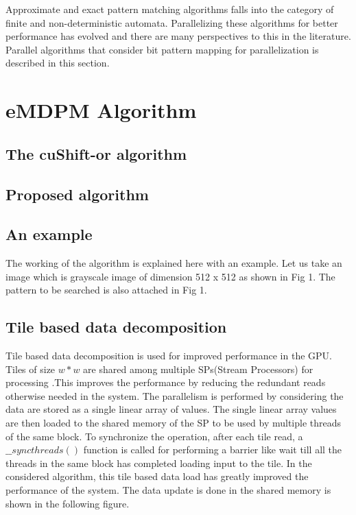 \documentclass[graybox]{svmult}
\begin{document}
Approximate and exact pattern matching algorithms falls into the category of finite and non-deterministic automata. Parallelizing these algorithms for better performance has evolved and there are many perspectives to this in the literature. Parallel algorithms that consider bit pattern mapping for parallelization is described in this section.

\section{eMDPM Algorithm}
\label{sec:3}

\subsection{The cuShift-or algorithm}
\label{subsec:1}

\subsection{Proposed algorithm}
\label{subsec:2}

\subsection{An example}
\label{subsec:3}
The working of the algorithm is explained here with an example. Let us take an image which is grayscale image of dimension 512 x 512 as shown in Fig 1. The pattern to be searched is also attached in Fig 1.

\subsection{Tile based data decomposition}
\label{subsec:4}
Tile based data decomposition is used for improved performance in the GPU. Tiles of size $w*w$ are shared among multiple SPs(Stream Processors) for processing .This improves the performance by reducing the redundant reads otherwise needed in the system. The parallelism is performed by considering the data are stored as a single linear array of values. The single linear array values are then loaded to the shared memory of the SP to be used by multiple threads of the same block. To synchronize the operation, after each tile read, a $\_\_syncthreads()$ function is called for performing a barrier like wait till all the threads in the same block has completed loading input to the tile. In the considered algorithm, this tile based data load has greatly improved the performance of the system. The data update is done in the shared memory is shown in the following figure.
\end{document}
